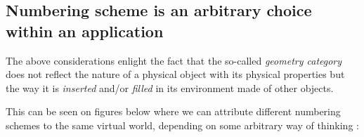 
\subsection{Numbering scheme is an arbitrary choice within an application}

\pn  The above  considerations  enlight the  fact  that the  so-called
\emph{geometry  category} does not  reflect the  nature of  a physical
object with its physical properties  but the way it is \emph{inserted}
and/or \emph{filled} in its environment made of other objects.

\pn This can be seen on figures below where we can attribute different
numbering  schemes  to  the  same  virtual world,  depending  on  some
arbitrary way of thinking :


